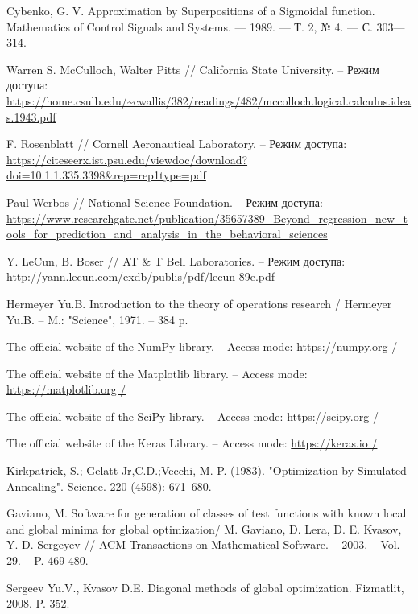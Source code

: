 \documentclass[11pt, oneside, a4paper]{article}
\begin{document}
\begin{biblioen}

Cybenko, G. V. Approximation by Superpositions of a Sigmoidal function. Mathematics of Control Signals and Systems. — 1989. — Т. 2, № 4. — С. 303—314.

Warren S. McCulloch, Walter Pitts // California State University. – Режим доступа: \url{https://home.csulb.edu/~cwallis/382/readings/482/mccolloch.logical.calculus.ideas.1943.pdf}

F. Rosenblatt // Cornell Aeronautical Laboratory. – Режим доступа: \url{https://citeseerx.ist.psu.edu/viewdoc/download?doi=10.1.1.335.3398&rep=rep1type=pdf}

Paul Werbos // National Science Foundation. – Режим доступа: \url{https://www.researchgate.net/publication/35657389_Beyond_regression_new_tools_for_prediction_and_analysis_in_the_behavioral_sciences}

Y. LeCun, B. Boser // AT \& T  Bell Laboratories. – Режим доступа: \url{http://yann.lecun.com/exdb/publis/pdf/lecun-89e.pdf}

Hermeyer Yu.B. Introduction to the theory of operations research / Hermeyer Yu.B. – M.: "Science", 1971. – 384 p.

The official website of the NumPy library. – Access mode: \url{https://numpy.org /}

The official website of the Matplotlib library. – Access mode: \url{https://matplotlib.org /}

The official website of the SciPy library. – Access mode: \url{https://scipy.org /}

The official website of the Keras Library. – Access mode: \url{https://keras.io /}

Kirkpatrick, S.; Gelatt Jr,C.D.;Vecchi, M. P. (1983). "Optimization by Simulated Annealing". Science. 220 (4598): 671–680.


Gaviano, M. Software for generation of classes of test functions with known local and global minima for global optimization/ M. Gaviano, D. Lera, D. E. Kvasov, Y. D. Sergeyev // ACM Transactions on Mathematical Software. – 2003. – Vol.  29. – P. 469-480.

Sergeev Yu.V., Kvasov D.E. Diagonal methods of global optimization. Fizmatlit, 2008. P. 352.

\end{biblioen}
\end{document}
